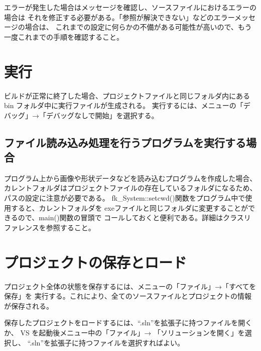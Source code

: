 \documentclass[a4j]{jarticle}
\begin{document}
エラーが発生した場合はメッセージを確認し、ソースファイルにおけるエラーの場合は
それを修正する必要がある。「参照が解決できない」などのエラーメッセージの場合は、
これまでの設定に何らかの不備がある可能性が高いので、もう一度これまでの手順を確認すること。


\section{実行}
ビルドが正常に終了した場合、プロジェクトファイルと同じフォルダ内にある 
bin フォルダ中に実行ファイルが生成される。
実行するには、メニューの「デバッグ」→「デバッグなしで開始」を選択する。

\subsection{ファイル読み込み処理を行うプログラムを実行する場合}
プログラム上から画像や形状データなどを読み込むプログラムを作成した場合、
カレントフォルダはプロジェクトファイルの存在しているフォルダになるため、
パスの設定に注意が必要である。
fk\_System::setcwd()関数をプログラム中で使用すると、カレントフォルダを
exeファイルと同じフォルダに変更することができるので、main()関数の冒頭で
コールしておくと便利である。詳細はクラスリファレンスを参照すること。


\section{プロジェクトの保存とロード}
プロジェクト全体の状態を保存するには、メニューの「ファイル」→「すべてを保存」を
実行する。これにより、全てのソースファイルとプロジェクトの情報が保存される。

保存したプロジェクトをロードするには、``.sln''を拡張子に持つファイルを開くか、
VS を起動後メニュー中の「ファイル」→ 「ソリューションを開く」を選択し、
``.sln''を拡張子に持つファイルを選択すればよい。
\end{document}
